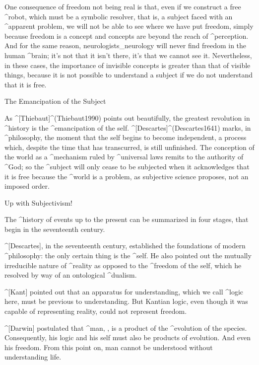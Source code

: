 One consequence of freedom not being real is that, even if we construct
a free ^{robot}, which must be a symbolic resolver, that is, a subject
faced with an ^{apparent problem}, we will not be able to see where we
have put freedom, simply because freedom is a concept and concepts are
beyond the reach of ^{perception}. And for the same reason,
neurologists_{neurology} will never find freedom in the human ^{brain};
it's not that it isn't there, it's that we cannot see it. Nevertheless,
in these cases, the importance of invisible concepts is greater than
that of visible things, because it is not possible to understand a
subject if we do not understand that it is free.


\Section The Emancipation of the Subject

As ^[Thiebaut]^(Thiebaut1990) points out beautifully, the greatest
revolution in ^{history} is the ^{emancipation} of the self.
^[Descartes]^(Descartes1641) marks, in ^{philosophy}, the moment that
the self begins to become independent, a process which, despite the time
that has transcurred, is still unfinished. The conception of the world
as a ^{mechanism} ruled by ^{universal laws} remits to the authority of
^{God}; so the ^{subject} will only cease to be subjected when it
acknowledges that it is free because the ^{world} is a problem, as
subjective science proposes, not an imposed order.


\Section Up with Subjectivism!

The ^{history} of events up to the present can be summarized in four
stages, that begin in the seventeenth century.

\beginpoints
{} ^[Descartes], in the seventeenth century, established
the foundations of modern ^{philosophy}: the only certain thing is the
^{self}. He also pointed out the mutually irreducible nature of
^{reality} as opposed to the ^{freedom} of the self, which he resolved
by way of an ontological ^{dualism}.

 ^[Kant] pointed out that an apparatus for understanding,
which we call ^{logic} here, must be previous to understanding. But
Kantian logic, even though it was capable of representing reality, could
not represent freedom.

 ^[Darwin] postulated that ^{man}, ,
is a product of the ^{evolution} of the species. Consequently, his logic
and his self must also be products of evolution. And even his freedom.
From this point on, man cannot be understood without understanding life.

